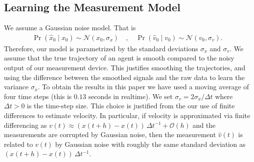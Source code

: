 \documentclass[letterpaper,10pt,conference]{ieeeconf}
\begin{document}
  \subsection{Learning the Measurement Model}
  We assume a Gaussian noise model.  
  That is
  \begin{align*}
  	\Pr( \hat{x}_0 \mid x_0 ) \sim \mathcal{N}( x_0 , \sigma_x) \quad, \quad \Pr( \hat{v}_0 \mid v_0 ) \sim \mathcal{N}( v_0, \sigma_v).
  \end{align*}
  Therefore, our model is parametrized by the standard deviations $\sigma_x$ and $\sigma_v$.
  We assume that the true trajectory of an agent is smooth compared to the noisy output of our measurement device.
  This justifies smoothing the trajectories, and using the difference between the smoothed signals and the raw data to learn the variance $\sigma_x$.
  To obtain the results in this paper we have used a moving average of four time steps (this is $0.13$ seconds in realtime).
  We set $\sigma_v = 2 \sigma_x / \Delta t$ where $\Delta t > 0$ is the time-step size.  
  This choice is justified from the our use of finite differences to estimate velocity.
  In particular, if velocity is approximated via finite differencing as $v(t) \approx (x(t+h) - x(t))\,\Delta t^{-1} + \mathcal{O}(h)$ and the measurements are corrupted by Gaussian noise, then the measurement $\hat{v}(t)$ is related to $v(t)$ by Gaussian noise with roughly the same standard deviation as $(x(t+h) - x(t))\,\Delta t^{-1}$.
  
\end{document}
